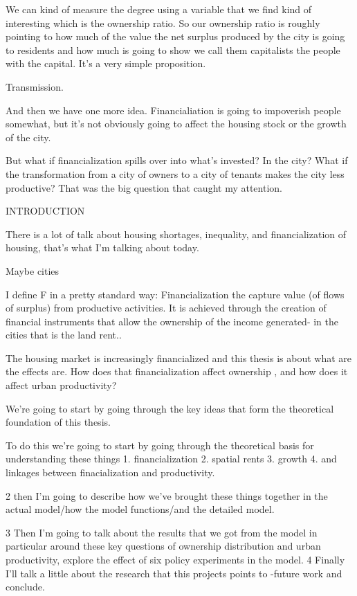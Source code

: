We can kind of measure the degree using a variable that we find kind of interesting which is the ownership ratio. So our ownership ratio is roughly pointing to how much of the value the net surplus produced by the city is going to residents and how much is going to show we call them capitalists the people with the capital.
It's a very simple proposition.

Transmission.

And then we have one more idea.  Financialiation is going to impoverish people somewhat, but it's not obviously going to affect the housing stock or the growth of the city. 

But what if financialization spills over into what's invested? In the city? What if the transformation from a city of owners to a city of tenants makes the city less productive? That was the big question that caught my attention.


INTRODUCTION

There is a lot of talk about housing shortages, inequality, and financialization of housing, that's what I'm talking about today.

Maybe cities

I define F in a pretty standard way: Financialization the capture value (of flows of surplus) from productive activities. It is achieved through the creation of financial instruments that allow the ownership of the income generated- in the cities that is the land rent.. 

The housing market is increasingly financialized and this thesis is about what are the effects are. How does that financialization affect ownership , and how does it affect urban productivity?

We’re going to start by going through the key ideas that form the theoretical foundation of this thesis.


To do this we’re going to start by going through the theoretical basis for understanding these things
1. financialization
2. spatial rents
3. growth
4. and linkages between finacialization and productivity.
 
 2 then I'm going to describe how we've brought these things together in the actual model/how the model functions/and the detailed model.
 
 3 Then I'm going to talk about the results that we got from the model in particular around these key questions of ownership distribution and urban productivity, explore the effect of six policy experiments in the model. 
 4 Finally I'll talk a little about the research that this projects points to -future work and conclude.



